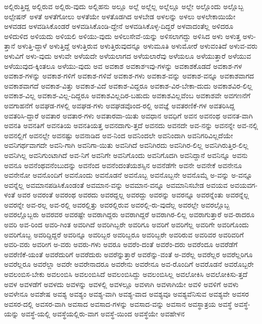 {ಅಲ್ಲಿರುತ್ತಿದ್ದ
ಅಲ್ಲಿರುವ
ಅಲ್ಲಿರು-ವುದು
ಅಲ್ಲಿಹನು
ಅಲ್ಲೂ
ಅಲ್ಲೆ
ಅಲ್ಲೆಲ್ಲ
ಅಲ್ಲೆಲ್ಲೂ
ಅಲ್ಲೇ
ಅಲ್ಲೊಂದು
ಅಲ್ಲೊಬ್ಬ
ಅಲ್ಸೇಷನ್
ಅಳತೆ
ಅಳತೆಗೋಲು
ಅಳತೆಯೇ
ಅಳತೊಡಗಿದ
ಅಳಬೇಡ
ಅಳಲನ್ನು
ಅಳಲು
ಅಳಲೇಕಾಯಿಯೇ
ಅಳವಡದ
ಅಳವಡಿಸಿಕೊಂಡರೆ
ಅಳವಡಿಸಿಕೊಂಡಿ-ದ್ದೇನೆ
ಅಳವಡಿಸಿಕೊಳ್ಳ-ದಿದ್ದರೆ
ಅಳವಾದಂತೆಲ್ಲ
ಅಳಿದರೂ
ಅಳಿದುಳಿದ
ಅಳಿಯದು
ಅಳಿಯಲಿ
ಅಳಿಯು-ವುದು
ಅಳಿಲುಸೇವೆ-ಯನ್ನು
ಅಳಿಸಲಾಗದ್ದು
ಅಳಿಸಿದ
ಅಳು
ಅಳುತ್ತ
ಅಳು-ತ್ತಾನೆ
ಅಳುತ್ತಿ-ದ್ದಾಳೆ
ಅಳುತ್ತಿದ್ದೆ
ಅಳುತ್ತಿರುವ
ಅಳುತ್ತಿರುವುದನ್ನೂ
ಅಳುಮೂತಿ
ಅಳುಮೋರೆ
ಅಳುವಂತಿದೆ
ಅಳುವ-ವರು
ಅಳುವಿಗೆ
ಅಳು-ವುದು
ಅಳುವೇ
ಅಳೆಯದೇ
ಅಳೆಯಲಾಗದ
ಅಳೆಯಲಾರೆವು
ಅಳೆಯಲೂ
ಅಳೆಯುತ್ತಾರೆ
ಅಳೆಯುವ
ಅಳೆಯುವುದ-ಕ್ಕಿಂತಲೂ
ಅಳೆಯು-ವುದು
ಅವ
ಅವಕಾಶ
ಅವಕಾಶಇವು-ಗಳನ್ನು
ಅವಕಾಶಕೊಡದೆ
ಅವಕಾಶ-ಗಳ
ಅವಕಾಶ-ಗಳನ್ನು
ಅವಕಾಶ-ಗಳಿಗೆ
ಅವಕಾಶ-ಗಳಿವೆ
ಅವಕಾಶ-ಗಳು
ಅವಕಾಶ-ವನ್ನು
ಅವಕಾಶ-ವನ್ನೂ
ಅವಕಾಶವಾಗದ
ಅವಕಾಶವಾಗದೆ
ಅವಕಾಶ-ವಿತ್ತು
ಅವಕಾಶ-ವಿದೆ
ಅವಕಾಶ-ವಿದ್ದರೂ
ಅವಕಾಶ-ವಿರ-ಬೇಕಾ-ದುದು
ಅವಕಾಶವಿರ-ಲಿಲ್ಲ
ಅವಕಾಶ-ವಿಲ್ಲ
ಅವಕಾಶ-ವಿಲ್ಲ-ದಿದ್ದರೂ
ಅವಕಾಶವಿಲ್ಲದಿರ-ಬಹುದು
ಅವಕಾಶವಿಲ್ಲವೆಂಬ
ಅವಕಾಶವೇ
ಅವಗಣನೆಗೆ
ಅವಗಾಹನೆಗೆ
ಅವಘಡ-ಗಳಲ್ಲಿ
ಅವಘಡ-ಗಳು
ಅವಘಡವೊಂದ-ರಲ್ಲಿ
ಅವಜ್ಞೆ
ಅವತರಣಿಕೆ-ಗಳ
ಅವತರಿಸಿದ್ದ
ಅವತರಿಸಿ-ದ್ದಾರೆ
ಅವತಾರ
ಅವತಾರ-ಗಳು
ಅವತಾರವಾ-ಯಿತು
ಅವಧಾನ
ಅವಧಿಗೆ
ಅವನ
ಅವನಂಥ
ಅವನತ-ವಾಗಿ
ಅವನತಿ
ಅವನತಿಗೆ
ಅವನತಿಯ
ಅವನತಿಯತ್ತ
ಅವನದಾಗು-ತ್ತದೆ
ಅವನದು
ಅವನದೇ
ಅವ-ನನ್ನು
ಅವನನ್ನೇ
ಅವ-ನಲ್ಲಿ
ಅವನಲ್ಲಿಗೆ
ಅವನಲ್ಲೇ
ಅವನಷ್ಟು
ಅವನಾಡಿದ
ಅವ-ನಿಂದ
ಅವನಿಂದಲೇ
ಅವನಿಂದಾಗಿ
ಅವನಿಗರಿವಿಲ್ಲದೆಯೇ
ಅವನಿಗರ್ಥವಾಗದೇ
ಅವನಿ-ಗಾಗಿ
ಅವನಿಗಾ-ಯಿತು
ಅವನಿಗಿದೆ
ಅವನಿಗಿರದು
ಅವನಿಗಿರ-ಲಿಲ್ಲ
ಅವನಿಗಿರುತ್ತಿರ-ಲಿಲ್ಲ
ಅವನಿಗಿಲ್ಲ
ಅವನಿಗುಂಟಾಗಿದೆ
ಅವ-ನಿಗೆ
ಅವನಿಗೇ
ಅವನಿಗೊಂದು
ಅವನಿಗೊದಗಿ
ಅವನಿದ್ದಾನೆ
ಅವನಿನ್ನೂ
ಅವನು
ಅವನೂ
ಅವನೆಂಥವನೆಂಬುದನ್ನು
ಅವನೆಂದ
ಅವನೆಂದಂತೆಯಶಸ್ಸಿನ
ಅವನೆಡೆಗೇ
ಅವನೇ
ಅವನೇಕೆ
ಅವನೇನೂ
ಅವನೇನೋ
ಅವನೊಂದಿಗೆ
ಅವನೊಂದು
ಅವನೊಡನೆ
ಅವನೊಬ್ಬ
ಅವನೊಬ್ಬನೇ
ಅವನೊಮ್ಮೆ
ಅ-ವನ್ನು
ಅ-ವನ್ನೂ
ಅವನ್ನೆಲ್ಲ
ಅವಮಾನಪಡಿಸಿಕೊಂಡಂತೆ
ಅವಮಾನ-ವನ್ನು
ಅವಮಾನ-ವನ್ನೂ
ಅವಮಾನಿಸಬೇಡ
ಅವಯವ
ಅವಯವಗ-ಳಂತೆ
ಅವರ
ಅವರಂತೆ
ಅವರಂಥ
ಅವರದು
ಅವರದ್ದಲ್ಲ
ಅವರದ್ದು
ಅವರನ್ನು
ಅವರನ್ನೂ
ಅವರನ್ನೆಂತು
ಅವರನ್ನೆಲ್ಲ
ಅವರನ್ನೇ
ಅವ-ರಲ್ಲ
ಅವ-ರಲ್ಲಿ
ಅವರಲ್ಲಿತ್ತು
ಅವರಲ್ಲಿರುವ
ಅವರಲ್ಲಿ-ರು-ವುದೆಲ್ಲ
ಅವರಲ್ಲೇ
ಅವರಲ್ಲೊಬ್ಬ
ಅವರಲ್ಲೊಬ್ಬರು
ಅವರವರ
ಅವರಷ್ಟೇ
ಅವರಾಗಿದ್ದರು
ಅವರಾಗಿದ್ದರೆ
ಅವರಾಗಿರ-ಲಿಲ್ಲ
ಅವರಾಗುತ್ತಾರೆ
ಅವ-ರಾದರೂ
ಅವರಿ
ಅವ-ರಿಂದ
ಅವರಿ-ಗಿಂತ
ಅವರಿಗಿದೆ
ಅವರಿಗಿಬ್ಬರೇ
ಅವರಿಗೂ
ಅವರಿಗೆ
ಅವರಿಗೆಲ್ಲ
ಅವರಿಗೇ
ಅವರಿಗೊಂದು
ಅವರಿಗೊಬ್ಬ
ಅವರಿದ್ದಿದ್ದರೆ
ಅವರಿನ್ನೂ
ಅವರಿಬ್ಬರ
ಅವರಿಬ್ಬರೂ
ಅವರಿಬ್ಬರೇ
ಅವರಿರುವ
ಅವರಿವರ
ಅವರಿವರಿಗೆ
ಅವರಿ-ವರು
ಅವರೀಗ
ಅ-ವರು
ಅವರು-ಗಳು
ಅವರೂ
ಅವರೆಂ-ದಂತೆ
ಅವರೆಂ-ದರು
ಅವರೆಂದೂ
ಅವರೆಡೆಗೆ
ಅವರೆಣಿಕೆ-ಯಂತೆ
ಅವರೆದುರಿಗೆ
ಅವರೆದುರು
ಅವರೆನ್ನುತ್ತಾರೆ
ಅವರೆನ್ನು-ವಂತೆ
ಅ-ವರೆಲ್ಲ
ಅವರೆಲ್ಲರ
ಅವರೆಲ್ಲರಿಗೂ
ಅವರೆಲ್ಲರೂ
ಅವರೆಲ್ಲಾ
ಅವರೇ
ಅವರೇನಾದರೂ
ಅವರೇನು
ಅವರೇನೂ
ಅವ-ರೊಂದಿಗೆ
ಅವರೊಡನೆ
ಅವರೊಬ್ಬರೇ
ಅವಲಂಬಿಸ-ಬೇಕು
ಅವಲಂಬಿಸಿ
ಅವಲಂಬಿಸಿದೆ
ಅವಲಂಬಿಸಿದ್ದು
ಅವಲಂಬಿಸಿಲ್ಲ
ಅವಲೋಕಿಸಿ
ಅವಲೋಕಿಸು-ತ್ತದೆ
ಅವಳ
ಅವಳಡೆಗೆ
ಅವಳದು
ಅವಳನ್ನು
ಅವಳಲ್ಲಿ
ಅವಳಲ್ಲೂ
ಅವಳಾಗಿ
ಅವಳಾಗಿಯೇ
ಅವಳಿ
ಅವಳಿಗೆ
ಅವಳು
ಅವಳೇನೂ
ಅವಶೇಷ
ಅವಶ್ಯ
ಅವಶ್ಯಂ
ಅವಶ್ಯ-ವಾಗಿ
ಅವಶ್ಯ-ವಾದ
ಅವಶ್ಯವೂ
ಅವಶ್ಯವೆನಿಸುವ
ಅವಶ್ಯವೇ
ಅವಸರ
ಅವಸರ-ದಲ್ಲಿ
ಅವಸರ-ವಾಗಿ
ಅವಸಾದ
ಅವಸಾದ-ಗಳನ್ನು
ಅವಸಾದ-ವನ್ನು
ಅವಸಾನ
ಅವಸ್ಥಾತ್ರಯ
ಅವಸ್ಥೆ
ಅವಸ್ಥೆ-ಯನ್ನು
ಅವಸ್ಥೆ-ಯಲ್ಲಿ
ಅವಸ್ಥೆಯಲ್ಲಿರು-ವಾಗ
ಅವಸ್ಥೆ-ಯಿಂದ
ಅವಸ್ಥೆಯೇ
ಅವಹೇಳನ
}
